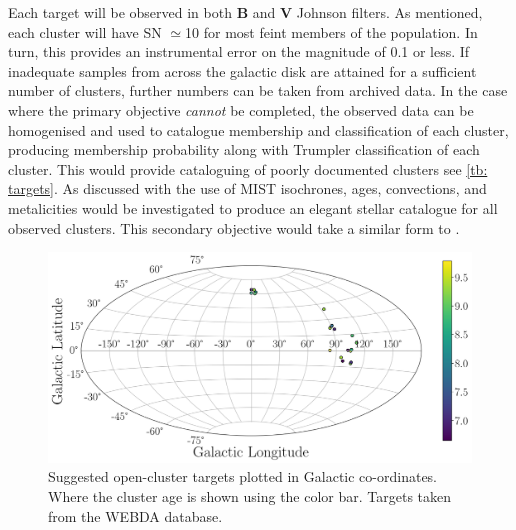 Each target will be observed in both \textbf{B} and \textbf{V} Johnson filters. As mentioned, each cluster will have SN $\simeq$10 for most feint members of the population. In turn, this provides an instrumental error on the magnitude of 0.1 or less. If inadequate samples from across the galactic disk are attained for a sufficient number of clusters, further numbers can be taken from archived data. In the case where the primary objective \textit{cannot} be completed, the observed data can be homogenised and used to catalogue membership and classification of each cluster, producing membership probability along with Trumpler classification of each cluster. This would provide cataloguing of poorly documented clusters see \cref{tb: targets}. As discussed with the use of MIST isochrones, ages, convections, and metalicities would be investigated to produce an elegant stellar catalogue for all observed clusters. This secondary objective would take a similar form to \cite{2004PASP..116..997V}.

\begin{figure}[h!]
    \centering
    \includegraphics[width = 12cm]{figs/mollweide.png}
    \caption{Suggested open-cluster targets plotted in Galactic co-ordinates. Where the cluster age is shown using the color bar. Targets taken from the WEBDA database. }
    \label{fig: mollweide_plot}
\end{figure}




